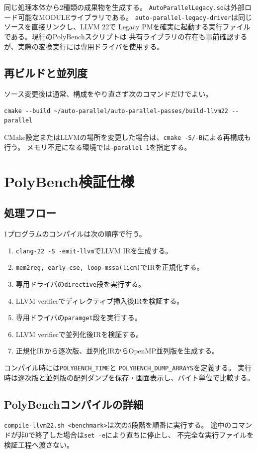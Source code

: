 \documentclass[a4paper,11pt]{ltjsarticle}
\begin{document}
同じ処理本体から2種類の成果物を生成する。
\texttt{AutoParallelLegacy.so}は外部ロード可能なMODULEライブラリである。
\texttt{auto-parallel-legacy-driver}は同じソースを直接リンクし、LLVM 22で
Legacy PMを確実に起動する実行ファイルである。現行のPolyBenchスクリプトは
共有ライブラリの存在も事前確認するが、実際の変換実行には専用ドライバを使用する。

\subsection{再ビルドと並列度}
ソース変更後は通常、構成をやり直さず次のコマンドだけでよい。
\begin{lstlisting}
cmake --build ~/auto-parallel/auto-parallel-passes/build-llvm22 --parallel
\end{lstlisting}
CMake設定またはLLVMの場所を変更した場合は、\texttt{cmake -S/-B}による再構成も行う。
メモリ不足になる環境では\texttt{--parallel 1}を指定する。

\section{PolyBench検証仕様}
\subsection{処理フロー}
1プログラムのコンパイルは次の順序で行う。
\begin{enumerate}[nosep]
  \item \texttt{clang-22 -S -emit-llvm}でLLVM IRを生成する。
  \item \texttt{mem2reg, early-cse, loop-mssa(licm)}でIRを正規化する。
  \item 専用ドライバの\texttt{directive}段を実行する。
  \item LLVM verifierでディレクティブ挿入後IRを検証する。
  \item 専用ドライバの\texttt{paramget}段を実行する。
  \item LLVM verifierで並列化後IRを検証する。
  \item 正規化IRから逐次版、並列化IRからOpenMP並列版を生成する。
\end{enumerate}

コンパイル時には\texttt{POLYBENCH\_TIME}と
\texttt{POLYBENCH\_DUMP\_ARRAYS}を定義する。
実行時は逐次版と並列版の配列ダンプを保存・画面表示し、バイト単位で比較する。

\subsection{PolyBenchコンパイルの詳細}
\texttt{compile-llvm22.sh <benchmark>}は次の5段階を順番に実行する。
途中のコマンドが非0で終了した場合は\texttt{set -e}により直ちに停止し、
不完全な実行ファイルを検証工程へ渡さない。
\end{document}
